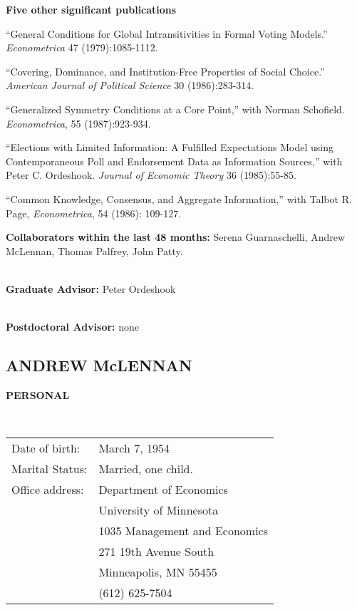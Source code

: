 \documentclass[12pt]{article}
\begin{document}
\noindent
{\bf Five other significant publications}
\begin{description}
\item
``General Conditions for Global Intransitivities in Formal Voting 
Models.''  {\em Econometrica} 47 (1979):1085-1112.
\item
``Covering, Dominance, and Institution-Free Properties of Social 
Choice.''  {\em American Journal of Political Science} 30 (1986):283-314.
\item
``Generalized Symmetry Conditions at a Core Point,'' with Norman 
Schofield.  {\em Econometrica}, 55 (1987):923-934.
\item
``Elections with Limited Information:  A Fulfilled Expectations Model 
using Contemporaneous Poll and Endorsement Data as Information 
Sources,'' with Peter C. Ordeshook.  {\em Journal of Economic Theory} 
36 (1985):55-85.
\item
``Common Knowledge, Consensus, and Aggregate Information,'' with
Talbot R. Page, {\it Econometrica}, 54 (1986): 109-127.

\end{description}



\noindent
{\bf Collaborators within the last 48 months:} Serena Guarnaschelli,
Andrew McLennan, Thomas Palfrey, John Patty.

\ \\
\noindent
{\bf Graduate Advisor:} Peter Ordeshook

\ \\
\noindent
{\bf Postdoctoral Advisor:} none

\newpage
\subsection{ANDREW McLENNAN}

\noindent
{\bf PERSONAL} 

\ \\
\begin{tabular}{ll}
Date of birth:&March 7, 1954\\
Marital Status:&Married, one child.\\
Office address:&Department of Economics \\
&University of Minnesota \\
&1035 Management and Economics \\
&271 19th Avenue South \\
&Minneapolis, MN 55455 \\
&(612) 625-7504 \\
\end{tabular}
\end{document}
